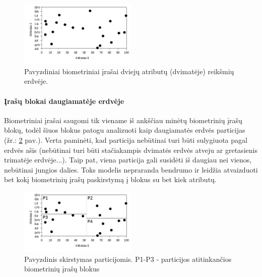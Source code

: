 \begin{figure}[H]
\begin{center}
\includegraphics[width=0.5\textwidth]{img/MultidimensionalGallery.png}
\caption{Pavyzdiniai biometriniai įrašai dviejų atributų (dvimatėje) reikšmių erdvėje.}
\label{img:multidimensionalGallery}
\end{center}
\end{figure}

\paragraph{Įrašų blokai daugiamatėje erdvėje}

Biometriniai įrašai saugomi tik viename iš ankščiau minėtų biometrinių įrašų blokų, todėl šiuos blokus patogu analizuoti kaip daugiamatės erdvės particijas (žr.: \ref{img:multidimensionalPartitionedGallery} pav.).
Verta paminėti, kad particija nebūtinai turi būti sulygiuota pagal erdvės ašis (nebūtinai turi būti stačiakampis dvimatės erdvės atveju ar gretasienis trimatėje erdvėje...).
Taip pat, viena particija gali susidėti iš daugiau nei vienos, nebūtinai jungios dalies.
Toks modelis nepraranda bendrumo ir leidžia atvaizduoti bet kokį biometrinių įrašų paskirstymą į blokus su bet kiek atributų.

\begin{figure}[H]
\begin{center}
\includegraphics[width=0.5\textwidth]{img/MultidimensionalPartitionedGallery.png}
\caption{Pavyzdinis skirstymas particijomis. P1-P3 - particijos atitinkančios biometrinių įrašų blokus}
\label{img:multidimensionalPartitionedGallery}
\end{center}
\end{figure}

